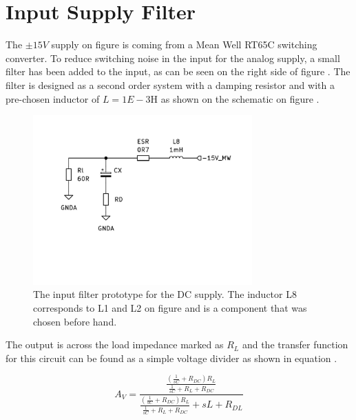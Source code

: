 \section{Input Supply Filter} \label{subsec:SupplyFilter}

The $\pm 15V$ supply on figure  is coming from a Mean Well RT65C switching converter. To reduce switching noise in the input for the analog supply, a small filter has been added to the input, as can be seen on the right side of figure . The filter is designed as a second order system with a damping resistor and with a pre-chosen inductor of $L = 1E-3$H as shown on the schematic on figure .

\begin{figure}[H]
    \centering
    \includegraphics[clip, trim=0 150 0 0, width=0.75\textwidth]{Sections/7_SystemDesign/Figures/7_1_5_SupplyFilterSch.pdf}
    \caption{The input filter prototype for the DC supply. The inductor L8 corresponds to L1 and L2 on figure  and is a component that was chosen before hand.}
    \label{fig_7_1_5_SupplyFilterSch}
\end{figure}

The output is across the load impedance marked as $R_L$ and the transfer function for this circuit can be found as a simple voltage divider as shown in equation .

\begin{equation}\label{eq:7_1_5_FILTF}
    A_V = \frac{    \frac{     (\frac{1}{sC} + R_{DC})R_L     }{  \frac{1}{sC} + R_L + R_{DC}  }      }{ \frac{     (\frac{1}{sC} + R_{DC})R_L     }{  \frac{1}{sC} + R_L + R_{DC}  }   + sL + R_{DL}}
\end{equation}

